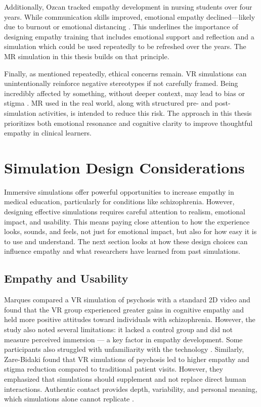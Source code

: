 \vspace{1em}

Additionally, Ozcan \cite{Ozcan2018} tracked empathy development in nursing students over four years. While communication skills improved, emotional empathy declined—likely due to burnout or emotional distancing \cite{Ozcan2018}. This underlines the importance of designing empathy training that includes emotional support and reflection and a simulation which could be used repeatedly to be refreshed over the years. The MR simulation in this thesis builds on that principle.

\vspace{1em}

Finally, as mentioned repeatedly, ethical concerns remain. VR simulations can unintentionally reinforce negative stereotypes if not carefully framed. Being incredibly affected by something, without deeper context, may lead to bias or stigma \cite{Rueda2020}. MR used in the real world, along with structured pre- and post-simulation activities, is intended to reduce this risk. The approach in this thesis prioritizes both emotional resonance and cognitive clarity to improve thoughtful empathy in clinical learners.


\section{Simulation Design Considerations}

Immersive simulations offer powerful opportunities to increase empathy in medical education, particularly for conditions like schizophrenia. However, designing effective simulations requires careful attention to realism, emotional impact, and usability. This means paying close attention to how the experience looks, sounds, and feels, not just for emotional impact, but also for how easy it is to use and understand. The next section looks at how these design choices can influence empathy and what researchers have learned from past simulations.

\subsection{Empathy and Usability}

Marques \cite{Marques2022} compared a VR simulation of psychosis with a standard 2D video and found that the VR group experienced greater gains in cognitive empathy and held more positive attitudes toward individuals with schizophrenia. However, the study also noted several limitations: it lacked a control group and did not measure perceived immersion — a key factor in empathy development. Some participants also struggled with unfamiliarity with the technology \cite{Marques2022}. Similarly, Zare-Bidaki \cite{Zare-Bidaki2022} found that VR simulations of psychosis led to higher empathy and stigma reduction compared to traditional patient visits. However, they emphasized that simulations should supplement and not replace direct human interactions. Authentic contact provides depth, variability, and personal meaning, which simulations alone cannot replicate \cite{Zare-Bidaki2022, Hsia2022}.

